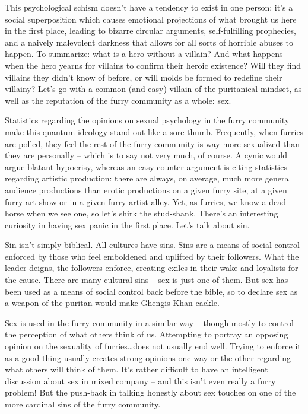 This psychological schism doesn't have a tendency to exist in one person: it's a social superposition which causes emotional projections of what brought us here in the first place, leading to bizarre circular arguments, self-fulfilling prophecies, and a naively malevolent darkness that allows for all sorts of horrible abuses to happen. To summarize: what is a hero without a villain? And what happens when the hero yearns for villains to confirm their heroic existence? Will they find villains they didn't know of before, or will molds be formed to redefine their villainy? Let's go with a common (and easy) villain of the puritanical mindset, as well as the reputation of the furry community as a whole: sex.

Statistics regarding the opinions on sexual psychology in the furry community make this quantum ideology stand out like a sore thumb. Frequently, when furries are polled, they feel the rest of the furry community is way more sexualized than they are personally -- which is to say not very much, of course. A cynic would argue blatant hypocrisy, whereas an easy counter-argument is citing statistics regarding artistic production: there are always, on average, much more general audience productions than erotic productions on a given furry site, at a given furry art show or in a given furry artist alley. Yet, as furries, we know a dead horse when we see one, so let's shirk the stud-shank. There's an interesting curiosity in having sex panic in the first place. Let's talk about sin.

Sin isn't simply biblical. All cultures have sins. Sins are a means of social control enforced by those who feel emboldened and uplifted by their followers. What the leader deigns, the followers enforce, creating exiles in their wake and loyalists for the cause. There are many cultural sins -- sex is just one of them. But sex has been used as a means of social control back before the bible, so to declare sex as a weapon of the puritan would make Ghengis Khan cackle.

Sex is used in the furry community in a similar way -- though mostly to control the perception of what others think of us. Attempting to portray an opposing opinion on the sexuality of furries…does not usually end well. Trying to enforce it as a good thing usually creates strong opinions one way or the other regarding what others will think of them. It's rather difficult to have an intelligent discussion about sex in mixed company -- and this isn't even really a furry problem! But the push-back in talking honestly about sex touches on one of the more cardinal sins of the furry community.

